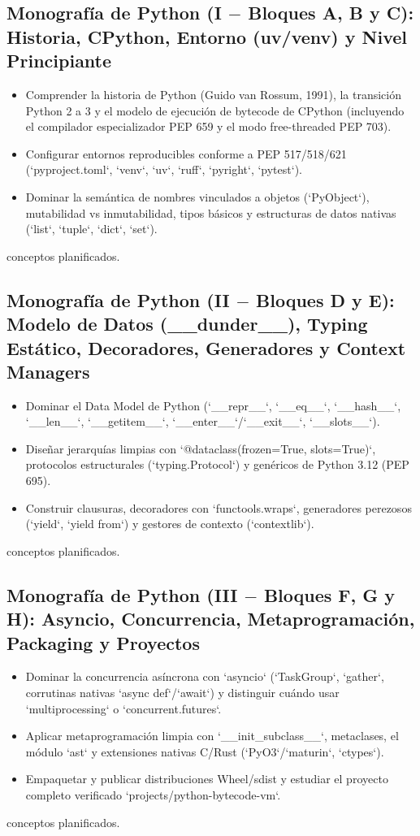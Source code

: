 \documentclass{book}
\begin{document}
\subsection*{\checkmark Monografía de Python (I \(-\) Bloques A, B y C): Historia, CPython, Entorno (uv/venv) y Nivel Principiante}
\begin{itemize}
\item Comprender la historia de Python (Guido van Rossum, 1991), la transición Python 2 a 3 y el modelo de ejecución de bytecode de CPython (incluyendo el compilador especializador PEP 659 y el modo free-threaded PEP 703).
\item Configurar entornos reproducibles conforme a PEP 517/518/621 (`pyproject.toml`, `venv`, `uv`, `ruff`, `pyright`, `pytest`).
\item Dominar la semántica de nombres vinculados a objetos (`PyObject`), mutabilidad vs inmutabilidad, tipos básicos y estructuras de datos nativas (`list`, `tuple`, `dict`, `set`).
\end{itemize}
 conceptos planificados.

\subsection*{\checkmark Monografía de Python (II \(-\) Bloques D y E): Modelo de Datos (\_\_dunder\_\_), Typing Estático, Decoradores, Generadores y Context Managers}
\begin{itemize}
\item Dominar el Data Model de Python (`\_\_repr\_\_`, `\_\_eq\_\_`, `\_\_hash\_\_`, `\_\_len\_\_`, `\_\_getitem\_\_`, `\_\_enter\_\_`/`\_\_exit\_\_`, `\_\_slots\_\_`).
\item Diseñar jerarquías limpias con `@dataclass(frozen=True, slots=True)`, protocolos estructurales (`typing.Protocol`) y genéricos de Python 3.12 (PEP 695).
\item Construir clausuras, decoradores con `functools.wraps`, generadores perezosos (`yield`, `yield from`) y gestores de contexto (`contextlib`).
\end{itemize}
 conceptos planificados.

\subsection*{\checkmark Monografía de Python (III \(-\) Bloques F, G y H): Asyncio, Concurrencia, Metaprogramación, Packaging y Proyectos}
\begin{itemize}
\item Dominar la concurrencia asíncrona con `asyncio` (`TaskGroup`, `gather`, corrutinas nativas `async def`/`await`) y distinguir cuándo usar `multiprocessing` o `concurrent.futures`.
\item Aplicar metaprogramación limpia con `\_\_init\_subclass\_\_`, metaclases, el módulo `ast` y extensiones nativas C/Rust (`PyO3`/`maturin`, `ctypes`).
\item Empaquetar y publicar distribuciones Wheel/sdist y estudiar el proyecto completo verificado `projects/python-bytecode-vm`.
\end{itemize}
 conceptos planificados.
\end{document}
